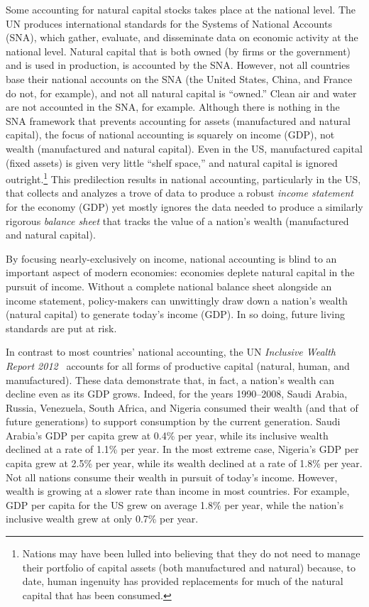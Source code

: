 Some accounting for natural capital stocks takes place at the national level. 
The UN produces international standards for the 
Systems of National Accounts (SNA), which gather, evaluate, 
and disseminate data on economic activity at the national level. 
Natural capital that is both owned (by firms or the government) and is used in production,
is accounted by the SNA. 
However, not all countries base their national accounts on the SNA 
(the United States, China, and France do not, for example), 
and not all natural capital is ``owned.'' 
Clean air and water are not accounted in the SNA, for example. 
Although there is nothing in the SNA framework that prevents 
accounting for assets (manufactured and natural capital),
the focus of national accounting is squarely on income (GDP), 
not wealth (manufactured and natural capital).\cite[p.~415]{UNSNA2008}  
Even in the US, manufactured capital (fixed assets) is given very little ``shelf space,'' 
and natural capital is ignored outright.\footnote{Nations 
	may have been lulled into believing that they 
	do not need to manage their portfolio of capital assets 
	(both manufactured and natural)
	because, to date, human ingenuity has provided replacements for much of the
	natural capital that has been consumed.}
This predilection results in national accounting,
particularly in the US, that collects and analyzes a trove of data to
produce a robust \emph{income statement} for the economy (GDP)
yet mostly ignores the data needed to produce a similarly rigorous
\emph{balance sheet} that tracks the value 
of a nation's wealth (manufactured and natural capital). 

By focusing nearly-exclusively on income, 
national accounting is blind to an important aspect of modern economies:
economies deplete natural capital in the pursuit of income.
Without a complete national balance sheet alongside an income statement, 
policy-makers can unwittingly draw down a nation's wealth (natural capital) 
to generate today's income (GDP). 
In so doing, future living standards are put at risk. 

In contrast to most countries' national accounting, 
the UN \emph{Inclusive Wealth Report 2012}~\cite{IWR2012} 
accounts for all forms of productive capital 
(natural, human, and manufactured). 
These data demonstrate that, in fact, 
a nation's wealth can decline even as its GDP grows. 
Indeed, for the years 1990--2008, Saudi Arabia, Russia, Venezuela, South Africa, and Nigeria 
consumed their wealth (and that of future generations) 
to support consumption by the current generation.
Saudi Arabia's GDP per capita grew at 0.4\% per year, 
while its inclusive wealth declined at a rate of 1.1\% per year. 
In the most extreme case, Nigeria's GDP per capita grew at 2.5\% per year, 
while its wealth declined at a rate of 1.8\% per year.
Not all nations consume their wealth in pursuit of today's income. 
However, wealth is growing at a slower rate than income
in most countries.
For example, GDP per capita for the US grew on average 1.8\% per year, 
while the nation's inclusive wealth grew at only 0.7\% per year.\cite[p.~44]{IWR2012}  

